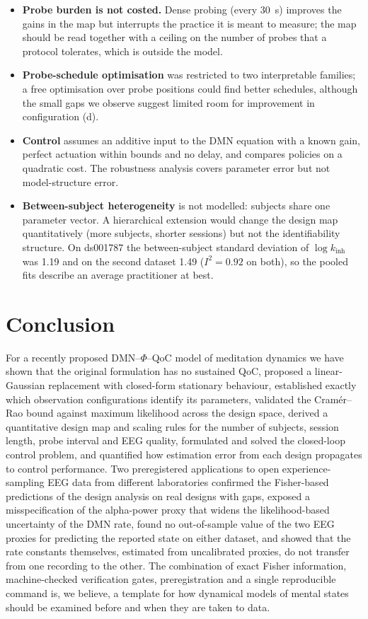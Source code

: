 \documentclass[12pt,a4paper]{article}
\theoremstyle{plain}
\theoremstyle{definition}
\theoremstyle{remark}
\newcommand{\kinh}{k_{\mathrm{inh}}}
\begin{document}
\begin{itemize}
  \item \textbf{Probe burden is not costed.} Dense probing (every 30~s) improves the gains in the map but interrupts the practice it is meant to measure; the map should be read together with a ceiling on the number of probes that a protocol tolerates, which is outside the model.
  \item \textbf{Probe-schedule optimisation} was restricted to two interpretable families; a free optimisation over probe positions could find better schedules, although the small gaps we observe suggest limited room for improvement in configuration (d).
  \item \textbf{Control} assumes an additive input to the DMN equation with a known gain, perfect actuation within bounds and no delay, and compares policies on a quadratic cost. The robustness analysis covers parameter error but not model-structure error.
  \item \textbf{Between-subject heterogeneity} is not modelled: subjects share one parameter vector. A hierarchical extension would change the design map quantitatively (more subjects, shorter sessions) but not the identifiability structure. On ds001787 the between-subject standard deviation of $\log\kinh$ was 1.19 and on the second dataset 1.49 ($I^2=0.92$ on both), so the pooled fits describe an average practitioner at best.
\end{itemize}

\section{Conclusion}
\label{sec:conclusion}

For a recently proposed DMN--$\Phi$--QoC model of meditation dynamics we have shown that the original formulation has no sustained QoC, proposed a linear-Gaussian replacement with closed-form stationary behaviour, established exactly which observation configurations identify its parameters, validated the Cram\'er--Rao bound against maximum likelihood across the design space, derived a quantitative design map and scaling rules for the number of subjects, session length, probe interval and EEG quality, formulated and solved the closed-loop control problem, and quantified how estimation error from each design propagates to control performance. Two preregistered applications to open experience-sampling EEG data from different laboratories confirmed the Fisher-based predictions of the design analysis on real designs with gaps, exposed a misspecification of the alpha-power proxy that widens the likelihood-based uncertainty of the DMN rate, found no out-of-sample value of the two EEG proxies for predicting the reported state on either dataset, and showed that the rate constants themselves, estimated from uncalibrated proxies, do not transfer from one recording to the other. The combination of exact Fisher information, machine-checked verification gates, preregistration and a single reproducible command is, we believe, a template for how dynamical models of mental states should be examined before and when they are taken to data.
\end{document}
